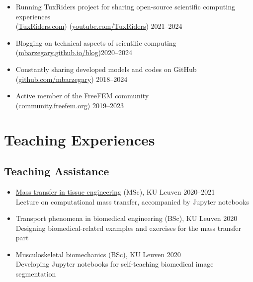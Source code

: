 \documentclass{cv}
\begin{document}
\begin{itemize}[itemsep=-0.2ex]
\item
Running TuxRiders project for sharing open-source scientific computing experiences \\
(\href{http://www.tuxriders.com/}{TuxRiders.com}) (\href{https://www.youtube.com/TuxRiders}{youtube.com/TuxRiders}) \hfill 2021--2024
\item
Blogging on technical aspects of scientific computing \\(\href{https://mbarzegary.github.io/blog}{mbarzegary.github.io/blog})\hfill 2020--2024
\item
Constantly sharing developed models and codes on GitHub \\(\href{https://github.com/mbarzegary}{github.com/mbarzegary}) \hfill 2018--2024
\item
Active member of the FreeFEM community\\(\href{https://community.freefem.org/}{community.freefem.org}) \hfill 2019--2023
\end{itemize}


\section{Teaching Experiences}

\subsection{Teaching Assistance}


\begin{itemize}[itemsep=-0.2ex]
\item 
\href{https://github.com/mbarzegary/mass-transport-tissue-engineering-fall2021}{Mass transfer in tissue engineering} (MSc), KU Leuven \hfill 2020--2021
\\
Lecture on computational mass transfer, accompanied by Jupyter notebooks 
\item 
Transport phenomena in biomedical engineering (BSc), KU Leuven \hfill 2020
\\
Designing biomedical-related examples and exercises for the mass transfer part
\item 
Musculoskeletal biomechanics (BSc), KU Leuven \hfill 2020
\\
Developing Jupyter notebooks for self-teaching biomedical image segmentation 
\end{itemize}
\end{document}
